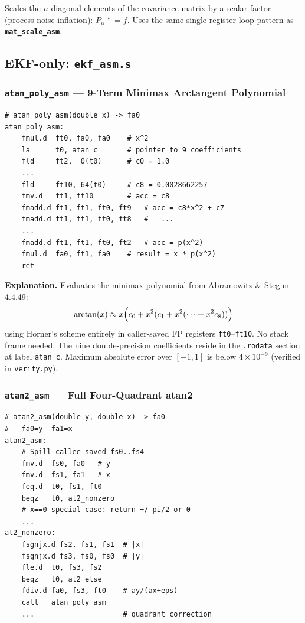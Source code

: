 \documentclass[12pt,a4paper]{article}
\newcommand{\reg}[1]{\texttt{\color{reg}#1}}
\newcommand{\func}[1]{\texttt{\bfseries #1}}
\begin{document}
Scales the $n$ diagonal elements of the covariance matrix by a
scalar factor (process noise inflation): $P_{ii} \mathrel{*}= f$.
Uses the same single-register loop pattern as
\func{mat\_scale\_asm}.

\subsection{EKF-only: \texttt{ekf\_asm.s}}

\subsubsection{\func{atan\_poly\_asm} --- 9-Term Minimax Arctangent Polynomial}

\begin{lstlisting}[caption={\func{atan\_poly\_asm}: Horner evaluation of A\&S 4.4.49},label=lst:atanpoly]
# atan_poly_asm(double x) -> fa0
atan_poly_asm:
    fmul.d  ft0, fa0, fa0    # x^2
    la      t0, atan_c       # pointer to 9 coefficients
    fld     ft2,  0(t0)      # c0 = 1.0
    ...
    fld     ft10, 64(t0)     # c8 = 0.0028662257
    fmv.d   ft1, ft10        # acc = c8
    fmadd.d ft1, ft1, ft0, ft9   # acc = c8*x^2 + c7
    fmadd.d ft1, ft1, ft0, ft8   #   ...
    ...
    fmadd.d ft1, ft1, ft0, ft2   # acc = p(x^2)
    fmul.d  fa0, ft1, fa0    # result = x * p(x^2)
    ret
\end{lstlisting}

\textbf{Explanation.}
Evaluates the minimax polynomial from Abramowitz \& Stegun 4.4.49:
\[
  \arctan(x) \approx x \Bigl( c_0 + x^2(c_1 + x^2(\cdots + x^2 c_8)) \Bigr)
\]
using Horner's scheme entirely in caller-saved FP registers
\reg{ft0}--\reg{ft10}. No stack frame needed. The nine
double-precision coefficients reside in the \texttt{.rodata} section
at label \texttt{atan\_c}.  Maximum absolute error over $[-1,1]$ is
below $4\times10^{-9}$ (verified in \texttt{verify.py}).

\subsubsection{\func{atan2\_asm} --- Full Four-Quadrant atan2}

\begin{lstlisting}[caption={\func{atan2\_asm}: full atan2(y,x) via quadrant logic},label=lst:atan2]
# atan2_asm(double y, double x) -> fa0
#   fa0=y  fa1=x
atan2_asm:
    # Spill callee-saved fs0..fs4
    fmv.d  fs0, fa0   # y
    fmv.d  fs1, fa1   # x
    feq.d  t0, fs1, ft0
    beqz   t0, at2_nonzero
    # x==0 special case: return +/-pi/2 or 0
    ...
at2_nonzero:
    fsgnjx.d fs2, fs1, fs1  # |x|
    fsgnjx.d fs3, fs0, fs0  # |y|
    fle.d  t0, fs3, fs2
    beqz   t0, at2_else
    fdiv.d fa0, fs3, ft0    # ay/(ax+eps)
    call   atan_poly_asm
    ...                     # quadrant correction
\end{lstlisting}
\end{document}
